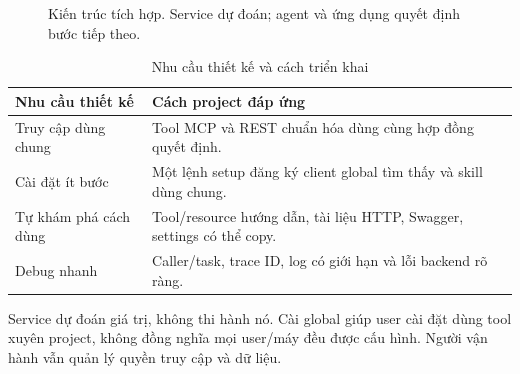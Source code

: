 \documentclass[10pt,a4paper]{article}
\begin{document}
\begin{figure}[H]
\centering
{}
\caption{Kiến trúc tích hợp. Service dự đoán; agent và ứng dụng quyết định bước tiếp theo.}
\end{figure}
\begin{table}[H]
\centering\small
\renewcommand{\arraystretch}{1.15}
\begin{tabularx}{\linewidth}{@{}YY@{}}
\toprule
\textbf{Nhu cầu thiết kế} & \textbf{Cách project đáp ứng} \\
\midrule
Truy cập dùng chung & Tool MCP và REST chuẩn hóa dùng cùng hợp đồng quyết định. \\
Cài đặt ít bước & Một lệnh setup đăng ký client global tìm thấy và skill dùng chung. \\
Tự khám phá cách dùng & Tool/resource hướng dẫn, tài liệu HTTP, Swagger, settings có thể copy. \\
Debug nhanh & Caller/task, trace ID, log có giới hạn và lỗi backend rõ ràng. \\
\bottomrule
\end{tabularx}
\caption{Nhu cầu thiết kế và cách triển khai}
\end{table}
Service dự đoán giá trị, không thi hành nó. Cài global giúp user cài đặt dùng tool xuyên project, không đồng nghĩa mọi user/máy đều được cấu hình. Người vận hành vẫn quản lý quyền truy cập và dữ liệu.
\end{document}
